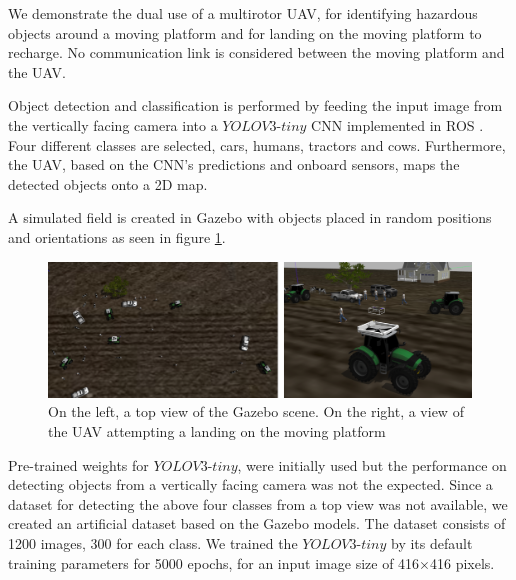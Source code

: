\documentclass[conference]{IEEEtran}
\begin{document}
We demonstrate the dual use of a multirotor UAV, for identifying
hazardous objects around a moving platform and for landing on the
moving platform to recharge.
%
%
No communication link is considered between the moving platform and the UAV.


Object detection and classification is performed by feeding the input
image from the vertically facing camera into a $YOLOV3$-$tiny$ CNN
\cite{yolov3} implemented in ROS \cite{bjelonicYolo2018}. Four
different classes are selected, cars, humans, tractors and
cows. Furthermore, the UAV, based on the CNN's predictions and onboard
sensors, maps the detected objects onto a 2D map.
 

A simulated field is created in Gazebo with objects placed in random
positions and orientations as seen in figure \ref{fig:Gazebo}.

\begin{figure}[h]
\centering
\includegraphics[scale=0.2]{gazebo_scalled.png}
\caption{On the left, a top view of the Gazebo scene. On the right, a view of the UAV attempting a landing on the moving platform }
\label{fig:Gazebo}
\end{figure}

Pre-trained weights for $YOLOV3$-$tiny$, were initially used but the
performance on detecting objects from a vertically facing camera was
not the expected. Since a dataset for detecting the above four classes
from a top view was not available, we created an artificial dataset
based on the Gazebo models. The dataset consists of 1200 images, 300
for each class. We trained the $YOLOV3$-$tiny$ by its default training
parameters for 5000 epochs, for an input image size of 416$\times$416
pixels.
\end{document}
